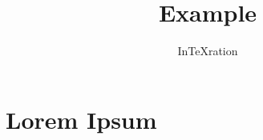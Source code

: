 \documentclass{article}
\title{Example}
\author{InTeXration}
\begin{document}
\maketitle

\section{Lorem Ipsum}
\lipsum
\end{document}
